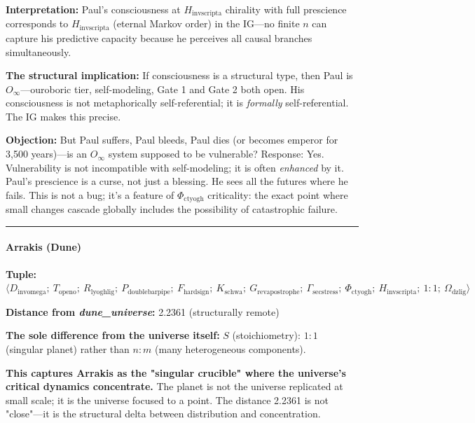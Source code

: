 \documentclass[12pt,a4paper]{article}
\begin{document}
\textbf{Interpretation:} Paul's consciousness at $H_{\text{invscripta}}$ chirality with full prescience corresponds to $H_{\text{invscripta}}$ (eternal Markov order) in the IG---no finite $n$ can capture his predictive capacity because he perceives all causal branches simultaneously.

\textbf{The structural implication:} If consciousness is a structural type, then Paul is $O_{\infty}$---ouroboric tier, self-modeling, Gate 1 and Gate 2 both open. His consciousness is not metaphorically self-referential; it is \emph{formally} self-referential. The IG makes this precise.

\textbf{Objection:} But Paul suffers, Paul bleeds, Paul dies (or becomes emperor for 3,500 years)---is an $O_{\infty}$ system supposed to be vulnerable? Response: Yes. Vulnerability is not incompatible with self-modeling; it is often \emph{enhanced} by it. Paul's prescience is a curse, not just a blessing. He sees all the futures where he fails. This is not a bug; it's a feature of $\Phi_{\text{ctyogh}}$ criticality: the exact point where small changes cascade globally includes the possibility of catastrophic failure.

\begin{center}
\rule{0.5\textwidth}{0.4pt}
\end{center}

\paragraph{Arrakis (Dune)}

\textbf{Tuple:} $\langle D_{\text{invomega}};\ T_{\text{openo}};\ R_{\text{lyoghlig}};\ P_{\text{doublebarpipe}};\ F_{\text{hardsign}};\ K_{\text{schwa}};\ G_{\text{revapostrophe}};\ \Gamma_{\text{secstress}};\ \Phi_{\text{ctyogh}};\ H_{\text{invscripta}};\ 1{:}1;\ \Omega_{\text{dzlig}} \rangle$

\textbf{Distance from \emph{dune\_universe}:} 2.2361 (structurally remote)

\textbf{The sole difference from the universe itself:} $S$ (stoichiometry): $1{:}1$ (singular planet) rather than $n{:}m$ (many heterogeneous components).

\textbf{This captures Arrakis as the "singular crucible" where the universe's critical dynamics concentrate.} The planet is not the universe replicated at small scale; it is the universe focused to a point. The distance 2.2361 is not "close"---it is the structural delta between distribution and concentration.
\end{document}
